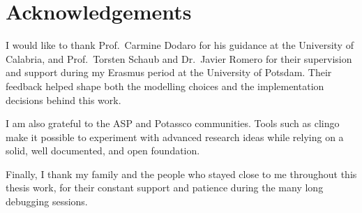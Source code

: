 \chapter*{Acknowledgements}

I would like to thank Prof.~Carmine Dodaro for his guidance at the University of Calabria, and Prof.~Torsten Schaub and Dr.~Javier Romero for their supervision and support during my Erasmus period at the University of Potsdam. Their feedback helped shape both the modelling choices and the implementation decisions behind this work.

I am also grateful to the ASP and Potassco communities. Tools such as clingo make it possible to experiment with advanced research ideas while relying on a solid, well documented, and open foundation.

Finally, I thank my family and the people who stayed close to me throughout this thesis work, for their constant support and patience during the many long debugging sessions.
